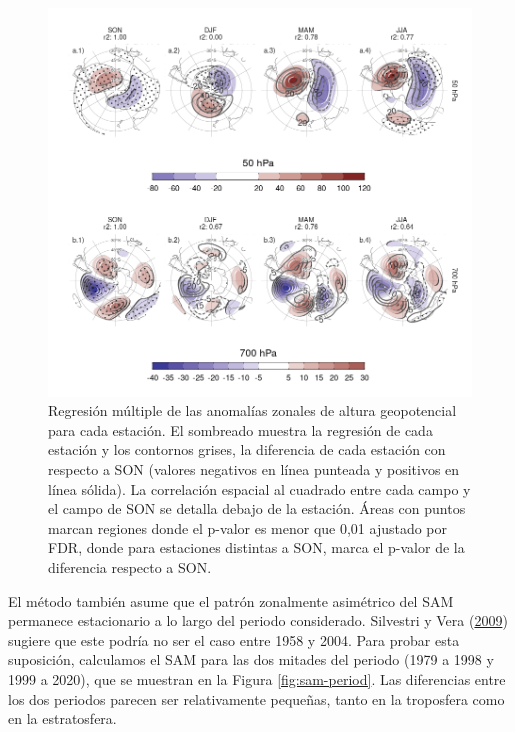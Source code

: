 \documentclass[12pt,oneside,a4paper]{reedthesis}
\begin{document}
\begin{figure}

{\centering \includegraphics{figures/30-sam/season-regression-1} 

}

\caption{Regresión múltiple de las anomalías zonales de altura geopotencial para cada estación. El sombreado muestra la regresión de cada estación y los contornos grises, la diferencia de cada estación con respecto a SON (valores negativos en línea punteada y positivos en línea sólida). La correlación espacial al cuadrado entre cada campo y el campo de SON se detalla debajo de la estación. Áreas con puntos marcan regiones donde el p-valor es menor que 0,01 ajustado por FDR, donde para estaciones distintas a SON, marca el p-valor de la diferencia respecto a SON.}\label{fig:season-regression}
\end{figure}

El método también asume que el patrón zonalmente asimétrico del SAM permanece estacionario a lo largo del periodo considerado.
Silvestri y Vera (\protect\hyperlink{ref-silvestri2009}{2009}) sugiere que este podría no ser el caso entre 1958 y 2004.
Para probar esta suposición, calculamos el SAM para las dos mitades del periodo (1979 a 1998 y 1999 a 2020), que se muestran en la Figura \ref{fig:sam-period}.
Las diferencias entre los dos periodos parecen ser relativamente pequeñas, tanto en la troposfera como en la estratosfera.
\end{document}
